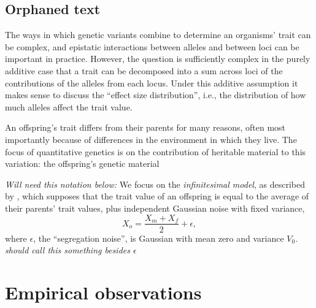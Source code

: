 \documentclass{article}
\newcommand{\comment}[1]{{\color{blue} \it #1}}
\theoremstyle{remark}
\theoremstyle{definition}
\begin{document}
\subsection*{Orphaned text}
The ways in which genetic variants combine to determine an organisms' trait can be complex,
and epistatic interactions between alleles and between loci can be important in practice.
However, the question is sufficiently complex in the purely additive case
that a trait can be decomposed into a sum across loci of the contributions of the alleles from each locus.
Under this additive assumption it makes sense to discuss the ``effect size distribution'',
i.e., the distribution of how much alleles affect the trait value.

An offspring's trait differs from their parents for many reasons,
often most importantly because of differences in the environment in which they live.
The focus of quantitative genetics is on the contribution of heritable material to this variation:
the offspring's genetic material 


\comment{Will need this notation below:}
We focus on the \emph{infinitesimal model},
as described by \citet{barton2017infinitesimal},
which supposes that the trait value of an offspring
is equal to the average of their parents' trait values,
plus independent Gaussian noise with fixed variance,
\begin{equation} \label{eqn:offspring_model}
    X_o = \frac{X_m + X_f}{2} + \epsilon,
\end{equation}
where $\epsilon$, the ``segregation noise'',
is Gaussian with mean zero and variance $V_0$.
\comment{should call this something besides $\epsilon$}

\section{Empirical observations}
\end{document}
